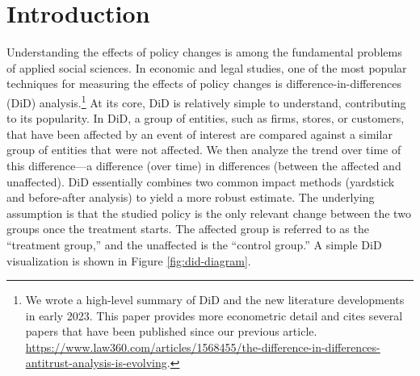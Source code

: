 \documentclass[12pt]{article}
\begin{document}
\tableofcontents

\doublespacing

\newpage
\section{Introduction} \label{sec:introduction}
Understanding the effects of policy changes is among the fundamental problems of applied social sciences. In economic and legal studies, one of the most popular techniques for measuring the effects of policy changes is difference-in-differences (DiD) analysis.\footnote{We wrote a high-level summary of DiD and the new literature developments in early 2023. This paper provides more econometric detail and cites several papers that have been published since our previous article. \url{https://www.law360.com/articles/1568455/the-difference-in-differences-antitrust-analysis-is-evolving}.}  At its core, DiD is relatively simple to understand, contributing to its popularity. In DiD, a group of entities, such as firms, stores, or customers, that have been affected by an event of interest are compared against a similar group of entities that were not affected. We then analyze the trend over time of this difference---a difference (over time) in differences (between the affected and unaffected). DiD essentially combines two common impact methods (yardstick and before-after analysis) to yield a more robust estimate. The underlying assumption is that the studied policy is the only relevant change between the two groups once the treatment starts. The affected group is referred to as the “treatment group,” and the unaffected is the “control group.” A simple DiD visualization is shown in Figure \ref{fig:did-diagram}.
\end{document}
